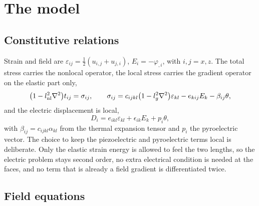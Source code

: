 \documentclass[11pt]{article}
\begin{document}
\section{The model}

\subsection{Constitutive relations}

Strain and field are $\varepsilon_{ij}=\tfrac12(u_{i,j}+u_{j,i})$, $E_i=-\varphi_{,i}$, with $i,j=x,z$.
The total stress carries the nonlocal operator, the local stress carries the gradient operator on the
elastic part only,
\begin{equation}
\bigl(1-l_{\rm nl}^2\nabla^2\bigr)t_{ij}=\sigma_{ij},\qquad
\sigma_{ij}=c_{ijkl}\bigl(1-l_g^2\nabla^2\bigr)\varepsilon_{kl}-e_{kij}E_k-\beta_{ij}\theta ,
\end{equation}
and the electric displacement is local,
\begin{equation}
D_i=e_{ikl}\varepsilon_{kl}+\epsilon_{ik}E_k+p_i\theta ,
\end{equation}
with $\beta_{ij}=c_{ijkl}\alpha_{kl}$ from the thermal expansion tensor and $p_i$ the pyroelectric vector.
The choice to keep the piezoelectric and pyroelectric terms local is deliberate. Only the elastic strain
energy is allowed to feel the two lengths, so the electric problem stays second order, no extra electrical
condition is needed at the faces, and no term that is already a field gradient is differentiated twice.

\subsection{Field equations}
\end{document}
